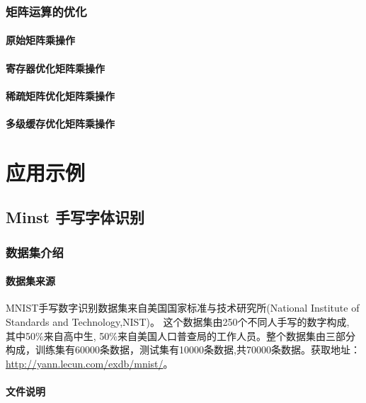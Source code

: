 \documentclass[UTF-8]{progbookcn}
\begin{document}
\section{矩阵运算的优化}
\subsection{原始矩阵乘操作}
\subsection{寄存器优化矩阵乘操作}
\subsection{稀疏矩阵优化矩阵乘操作}
\subsection{多级缓存优化矩阵乘操作}


\part{应用示例}



\chapter{Minst 手写字体识别}
\section{数据集介绍}

\subsection{数据集来源}
MNIST手写数字识别数据集来自美国国家标准与技术研究所(National Institute of Standards and Technology,NIST)。
这个数据集由250个不同人手写的数字构成, 其中50\%来自高中生, 50\%来自美国人口普查局的工作人员。整个数据集由三部分构成，训练集有60000条数据，测试集有10000条数据,共70000条数据。获取地址：\url{ http://yann.lecun.com/exdb/mnist/}。


\subsection{文件说明}
\end{document}
